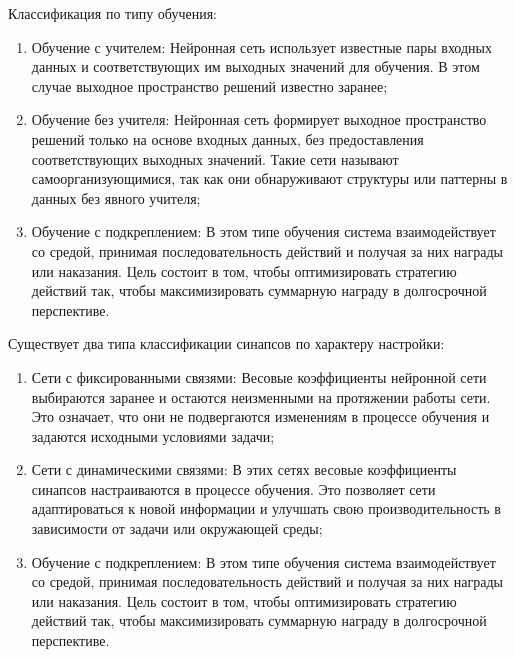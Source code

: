 Классификация по типу обучения:
\begin{enumerate}
\item Обучение с учителем: Нейронная сеть использует известные пары входных данных и соответствующих им выходных значений для обучения. В этом случае выходное пространство решений известно заранее;
\item Обучение без учителя: Нейронная сеть формирует выходное пространство решений только на основе входных данных, без предоставления соответствующих выходных значений. Такие сети называют самоорганизующимися, так как они обнаруживают структуры или паттерны в данных без явного учителя;
\item Обучение с подкреплением: В этом типе обучения система взаимодействует со средой, принимая последовательность действий и получая за них награды или наказания. Цель состоит в том, чтобы оптимизировать стратегию действий так, чтобы максимизировать суммарную награду в долгосрочной перспективе.
\end{enumerate}

Существует два типа классификации синапсов по характеру настройки:
\begin{enumerate}
\item  Сети с фиксированными связями: Весовые коэффициенты нейронной сети выбираются заранее и остаются неизменными на протяжении работы сети. Это означает, что они не подвергаются изменениям в процессе обучения и задаются исходными условиями задачи;
\item Сети с динамическими связями: В этих сетях весовые коэффициенты синапсов настраиваются в процессе обучения. Это позволяет сети адаптироваться к новой информации и улучшать свою производительность в зависимости от задачи или окружающей среды;
 \item Обучение с подкреплением: В этом типе обучения система взаимодействует со средой, принимая последовательность действий и получая за них награды или наказания. Цель состоит в том, чтобы оптимизировать стратегию действий так, чтобы максимизировать суммарную награду в долгосрочной перспективе.
\end{enumerate}

